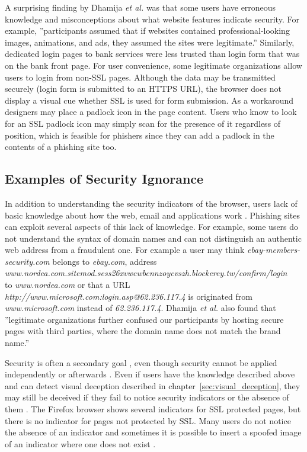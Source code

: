 \documentclass[english,gradu]{tktltiki}
\begin{document}
                  A surprising finding by Dhamija \emph{et al.} \cite{why_phishing_works_06} was that some users have erroneous knowledge and misconceptions about what website features indicate security. For example, ''participants assumed that if websites contained professional-looking images, animations, and ads, they assumed the sites were legitimate.'' Similarly, dedicated login pages to bank services were less trusted than login form that was on the bank front page. For user convenience, some legitimate organizations allow users to login from non-SSL pages. Although the data may be transmitted securely (login form is submitted to an HTTPS URL), the browser does not display a visual cue whether SSL is used for form submission. As a workaround designers may place a padlock icon in the page content. Users who know to look for an SSL padlock icon may simply scan for the presence of it regardless of position, which is feasible for phishers since they can add a padlock in the contents of a phishing site too.


          \subsection{Examples of Security Ignorance}

              In addition to understanding the security indicators of the browser, users lack of basic knowledge about how the web, email and applications work \cite{why_phishing_works_06}. Phishing sites can exploit several aspects of this lack of knowledge. For example, some users do not understand the syntax of domain names and can not distinguish an authentic web address from a fraudulent one. For example a user may think
          \emph{ebay-members-security.com} belongs to \emph{ebay.com}, address \\
          \emph{www.nordea.com.sitemod.sess26xvwcwbcnnzoycvszh.blockerey.tw/confirm/login} \\
          to \emph{www.nordea.com} or that a URL \emph{http://www.microsoft.com:login.asp@62.236.117.4}
          is originated from \emph{www.microsoft.com} instead of \emph{62.236.117.4}.
          Dhamija \emph{et al.} \cite{why_phishing_works_06} also found that ''legitimate organizations further confused our participants by hosting secure pages with third parties, where the domain name does not match the brand name.''

              Security is often a secondary goal \cite{why_phishing_works_06}, even though security cannot be applied independently or afterwards \cite{schneier_secrets_and_lies_2000, lampson_distributed_1992}. Even if users have the knowledge described above and can detect visual deception described in chapter~\ref{sec:visual_deception}, they may still be deceived if they fail to notice security indicators or the absence of them \cite{why_phishing_works_06}. The Firefox browser shows several indicators for SSL protected pages, but there is no indicator for pages not protected by SSL. Many users do not notice the absence of an indicator and sometimes it is possible to insert a spoofed image of an indicator where one does not exist \cite{why_phishing_works_06}.
\end{document}

